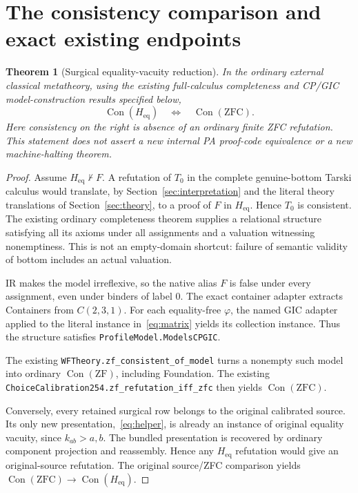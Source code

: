 \documentclass[11pt,letterpaper]{article}
\newtheorem{theorem}{Theorem}[section]
\theoremstyle{definition}\newtheorem{definition}[theorem]{Definition}
\theoremstyle{remark}\newtheorem{remark}[theorem]{Remark}
\newcommand{\Con}{\operatorname{Con}}
\newcommand{\To}{\rightarrow}
\newcommand{\Hh}{H_{\mathrm{eq}}}
\newcommand{\file}[1]{\begingroup\small\ttfamily\nolinkurl{#1}\endgroup}
\begin{document}
\section{The consistency comparison and exact existing endpoints}\label{sec:consistency}
\begin{theorem}[Surgical equality-vacuity reduction]\label{thm:main}
In the ordinary external classical metatheory, using the existing full-calculus completeness and CP/GIC model-construction results specified below,
\[
 \Con(\Hh)\quad\Longleftrightarrow\quad\Con(\mathrm{ZFC}).
\]
Here consistency on the right is absence of an ordinary finite ZFC refutation. This statement does not assert a new internal PA proof-code equivalence or a new machine-halting theorem.
\end{theorem}
\begin{proof}
Assume $\Hh\nvdash F$. A refutation of $T_0$ in the complete genuine-bottom Tarski calculus would translate, by Section~\ref{sec:interpretation} and the literal theory translations of Section~\ref{sec:theory}, to a proof of $F$ in $\Hh$. Hence $T_0$ is consistent. The existing ordinary completeness theorem supplies a relational structure satisfying all its axioms under all assignments and a valuation witnessing nonemptiness. This is not an empty-domain shortcut: failure of semantic validity of bottom includes an actual valuation.

IR makes the model irreflexive, so the native alias $F$ is false under every assignment, even under binders of label 0. The exact container adapter extracts Containers from $C(2,3,1)$. For each equality-free $\varphi$, the named GIC adapter applied to the literal instance in~\eqref{eq:matrix} yields its collection instance. Thus the structure satisfies \file{ProfileModel.ModelsCPGIC}.

The existing \file{WFTheory.zf_consistent_of_model} turns a nonempty such model into ordinary $\Con(\mathrm{ZF})$, including Foundation. The existing \file{ChoiceCalibration254.zf_refutation_iff_zfc} then yields $\Con(\mathrm{ZFC})$.

Conversely, every retained surgical row belongs to the original calibrated source. Its only new presentation,~\eqref{eq:helper}, is already an instance of original equality vacuity, since $k_{ab}>a,b$. The bundled presentation is recovered by ordinary component projection and reassembly. Hence any $\Hh$ refutation would give an original-source refutation. The original source/ZFC comparison yields $\Con(\mathrm{ZFC})\To\Con(\Hh)$.
\end{proof}
\end{document}
